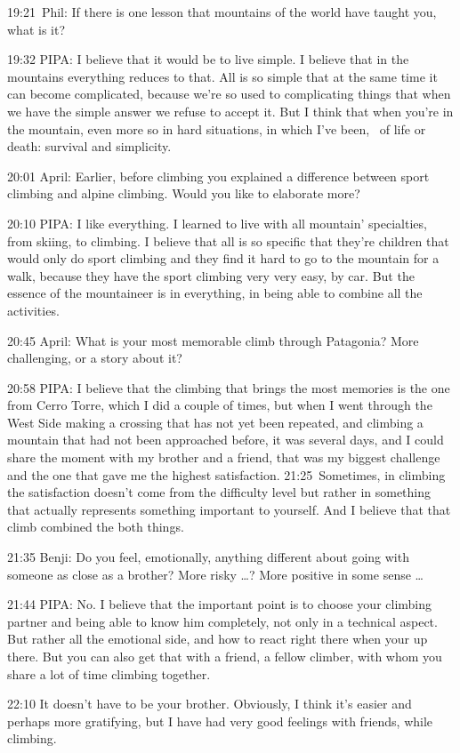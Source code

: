 19:21~Phil: If there is one lesson that mountains of the world have
taught you, what is it?

19:32 PIPA: I believe that it would be to live simple. I believe that in
the mountains everything reduces to that. All is so simple that at the
same time it can become complicated, because we're so used to
complicating things that when we have the simple answer we refuse to
accept it. But I think that when you're in the mountain, even more so in
hard situations, in which I've been,~ of life or death: survival and
simplicity.

20:01 April: Earlier, before climbing you explained a difference between
sport climbing and alpine climbing. Would you like to elaborate more?

20:10 PIPA: I like everything. I learned to live with all mountain'
specialties, from skiing, to climbing. I believe that all is so specific
that they're children that would only do sport climbing and they find it
hard to go to the mountain for a walk, because they have the sport
climbing very very easy, by car. But the essence of the mountaineer is
in everything, in being able to combine all the activities.

20:45 April: What is your most memorable climb through Patagonia? More
challenging, or a story about it?

20:58 PIPA: I believe that the climbing that brings the most memories is
the one from Cerro Torre, which I did a couple of times, but when I went
through the West Side making a crossing that has not yet been repeated,
and climbing a mountain that had not been approached before, it was
several days, and I could share the moment with my brother and a friend,
that was my biggest challenge and the one that gave me the highest
satisfaction. 21:25~Sometimes, in climbing the satisfaction doesn't come
from the difficulty level but rather in something that actually
represents something important to yourself. And I believe that that
climb combined the both things.

21:35 Benji: Do you feel, emotionally, anything different about going
with someone as close as a brother? More risky \ldots{}? More positive
in some sense \ldots{}

21:44 PIPA: No. I believe that the important point is to choose your
climbing partner and being able to know him completely, not only in a
technical aspect. But rather all the emotional side, and how to react
right there when your up there. But you can also get that with a friend,
a fellow climber, with whom you share a lot of time climbing together.

22:10 It doesn't have to be your brother. Obviously, I think it's easier
and perhaps more gratifying, but I have had very good feelings with
friends, while climbing.
